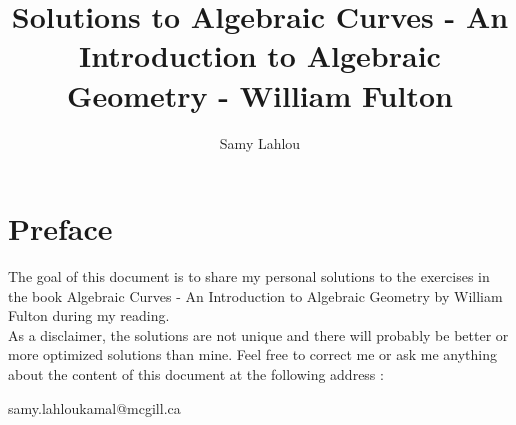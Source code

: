 \documentclass[12pt, oneside]{book}
\title{Solutions to Algebraic Curves - An Introduction to Algebraic Geometry - William Fulton}
\author{Samy Lahlou}
\newcounter{exercise}[chapter] %
\begin{document}
\maketitle

\chapter*{Preface}

The goal of this document is to share my personal solutions to the exercises
in the book Algebraic Curves - An Introduction to Algebraic Geometry by William Fulton during my reading. \\
As a disclaimer, the solutions are not unique and there will probably be better or more optimized solutions than mine. Feel free to correct me or ask me anything about the content of this document at the 
following address :

\noindent samy.lahloukamal@mcgill.ca

\tableofcontents




























\end{document}
